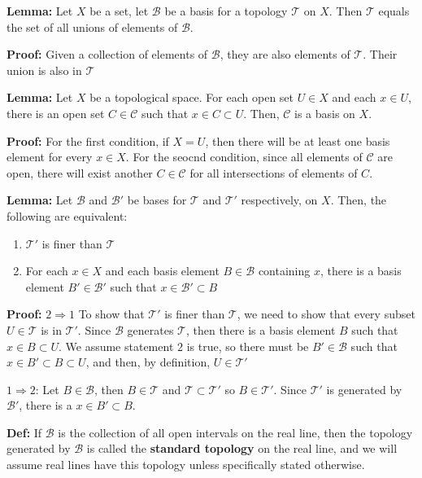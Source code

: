 \documentclass{article}
\begin{document}
\textbf{Lemma:} Let $X$ be a set, let $\mathcal{B}$ be a basis for a topology $\mathcal{T}$ on $X$. Then $\mathcal{T}$ equals the set of all unions of elements of $\mathcal{B}$.

\textbf{Proof:} Given a collection of elements of $\mathcal{B}$, they are also elements of $\mathcal{T}$. Their union is also in $\mathcal{T}$

\textbf{Lemma:} Let $X$ be a topological space. For each open set $U \in X$ and each $x \in U$, there is an open set $C \in \mathcal{C}$ such that $x \in C \subset U$. Then, $\mathcal{C}$ is a basis on $X$.

\textbf{Proof:} For the first condition, if $X = U$, then there will be at least one basis element for every $x \in X$. For the seocnd condition, since all elements of $\mathcal{C}$ are open, there will exist another $C \in \mathcal{C}$ for all intersections of elements of $C$. 

\textbf{Lemma:} Let $\mathcal{B}$ and $\mathcal{B'}$ be bases for $\mathcal{T}$ and $\mathcal{T'}$ respectively, on $X$. Then, the following are equivalent:

\begin{enumerate}
    \item $\mathcal{T'}$ is finer than $\mathcal{T}$
    \item For each $x \in X$ and each basis element $B \in \mathcal{B}$ containing $x$, there is a basis element $B' \in \mathcal{B'}$ such that $x\in \mathcal{B}' \subset B$
\end{enumerate}

\textbf{Proof:} $2 \Rightarrow 1$ To show that $\mathcal{T'}$ is finer than $\mathcal{T}$, we need to show that every subset $U \in \mathcal{T}$ is in $\mathcal{T'}$. Since $\mathcal{B}$ generates $\mathcal{T}$, then there is a basis element $B$ such that $x \in B \subset U$. We assume statement $2$ is true, so there must be $B' \in \mathcal{B}$ such that $x \in B' \subset B \subset U$, and then, by definition, $U \in \mathcal{T'}$

$1\Rightarrow 2$: Let $B \in \mathcal{B}$, then $B \in \mathcal{T}$ and $\mathcal{T} \subset \mathcal{T'}$ so $B \in \mathcal{T'}$. Since $\mathcal{T'}$ is generated by $\mathcal{B'}$, there is a $x \in B' \subset B$. 

\textbf{Def:} If $\mathcal{B}$ is the collection of all open intervals on the real line, then the topology generated by $\mathcal{B}$ is called the \textbf{standard topology} on the real line, and we will assume real lines have this topology unless specifically stated otherwise. 
\end{document}
